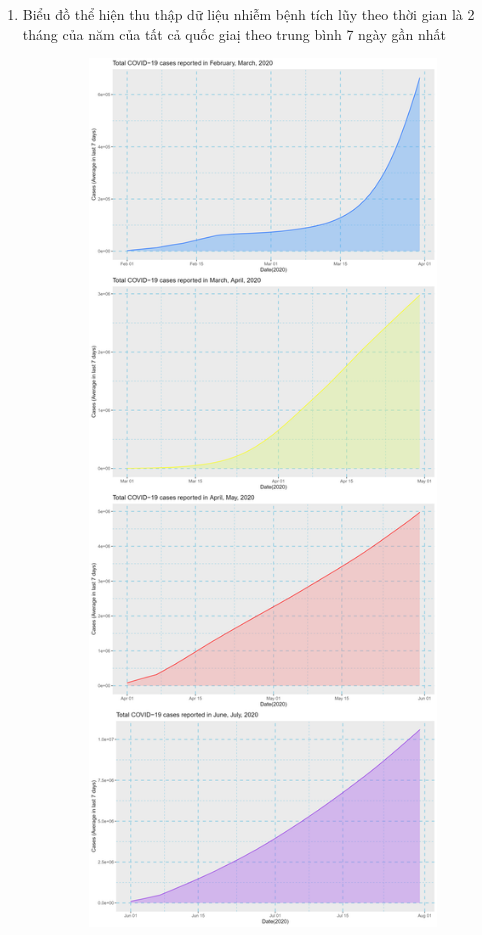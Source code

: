 \documentclass[a4paper]{article}
\theoremstyle{definition}
\begin{document}
\begin{enumerate}[i)]
\begin{enumerate}[1)]
\begin{figure}[H]
			\end{figure}
			\item Biểu đồ thể hiện thu thập dữ liệu nhiễm bệnh tích lũy theo thời gian là 2 tháng của năm của tất cả quốc giaị theo trung bình 7 ngày gần nhất
			\begin{figure}[H]
				\centering
				\includegraphics[height=23cm,width=13cm]{images/8.5.1.png}
			\end{figure}
			\begin{figure}[H]
				\centering

\end{figure}
\end{enumerate}
\end{enumerate}
\end{document}
